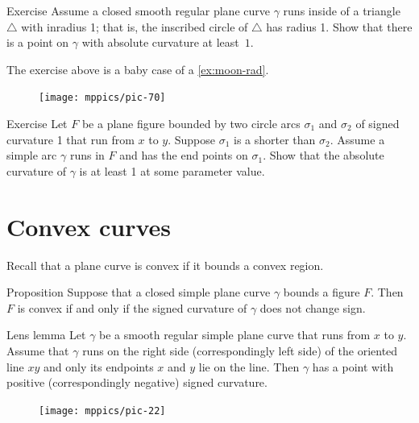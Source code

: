 \begin{thm}{Exercise}\label{ex:in-triangle}
Assume a closed smooth regular plane curve $\gamma$ runs inside of a triangle $\triangle$ with inradius 1; that is, the inscribed circle of $\triangle$ has radius 1.
Show that there is a point on $\gamma$ with absolute curvature at least~$1$.
\end{thm}

The exercise above is a baby case of a \ref{ex:moon-rad}.

{

\begin{figure}
\vskip-4mm
\centering
\texttt{[image: mppics/pic-70]}
\vskip0mm
\end{figure}

\begin{thm}{Exercise}\label{ex:lens}
Let $F$ be a plane figure bounded by two circle arcs $\sigma_1$ and $\sigma_2$ of signed curvature 1 that run from $x$ to $y$.
Suppose $\sigma_1$ is a shorter than $\sigma_2$.
Assume a simple arc $\gamma$ runs in $F$ and has the end points on $\sigma_1$.
Show that the absolute curvature of $\gamma$ is at least 1 at some parameter value.

\end{thm}

}

\section*{Convex curves}

Recall that a plane curve is convex if it bounds a convex region.

\begin{thm}{Proposition}\label{prop:convex}
Suppose that a closed simple plane curve $\gamma$ bounds a figure $F$.
Then $F$ is convex if and only if the signed curvature of $\gamma$ does not change sign.
\end{thm}


\begin{thm}{Lens lemma}\label{lem:lens}
Let $\gamma$ be a smooth regular simple plane curve that runs from $x$ to $y$.
Assume that $\gamma$ runs on the right side (correspondingly left side) of the oriented line $xy$ and only its endpoints $x$ and $y$ lie on the line.
Then $\gamma$ has a point with positive (correspondingly negative) signed curvature.
\end{thm}

\begin{figure}
\vskip-4mm
\centering
\texttt{[image: mppics/pic-22]}
\vskip0mm
\end{figure}

